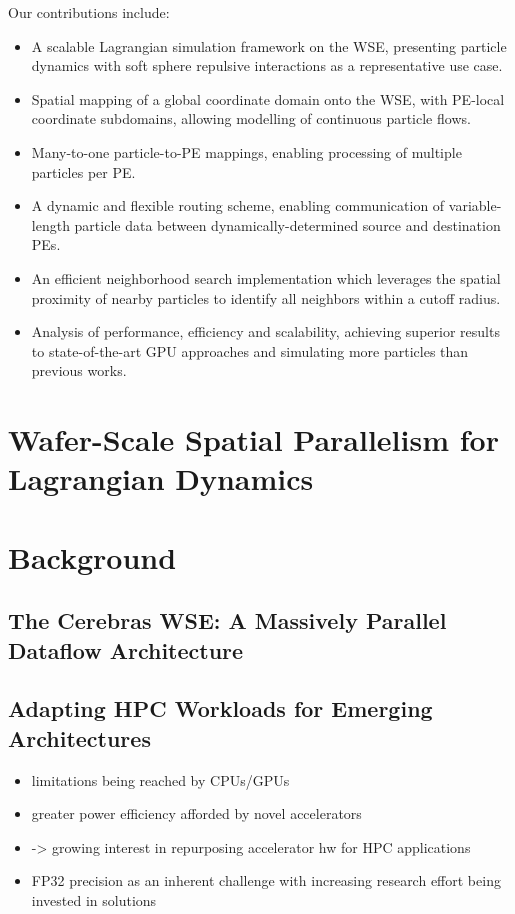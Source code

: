 \documentclass[review, anonymous, acmsmall]{acmart}
\begin{document}
Our contributions include:
\begin{itemize}
  \item A scalable Lagrangian simulation framework on the WSE, presenting particle dynamics with soft sphere repulsive interactions as a representative use case.
	\item Spatial mapping of a global coordinate domain onto the WSE, with PE-local coordinate subdomains, allowing modelling of continuous particle flows.
	\item Many-to-one particle-to-PE mappings, enabling processing of multiple particles per PE.
	\item A dynamic and flexible routing scheme, enabling communication of variable-length particle data between dynamically-determined source and destination PEs.
	\item An efficient neighborhood search implementation which leverages the spatial proximity of nearby particles to identify all neighbors within a cutoff radius.
  \item Analysis of performance, efficiency and scalability, achieving superior results to state-of-the-art GPU approaches and simulating more particles than previous works.
\end{itemize}

\section{Wafer-Scale Spatial Parallelism for Lagrangian Dynamics}

\section{Background}
\subsection{The Cerebras WSE: A Massively Parallel Dataflow Architecture}
\subsection{Adapting HPC Workloads for Emerging Architectures}
\begin{itemize}
  \item limitations being reached by CPUs/GPUs
  \item greater power efficiency afforded by novel accelerators
  \item -> growing interest in repurposing accelerator hw for HPC applications
  \item FP32 precision as an inherent challenge with increasing research effort being invested in solutions
\end{itemize}
\end{document}

